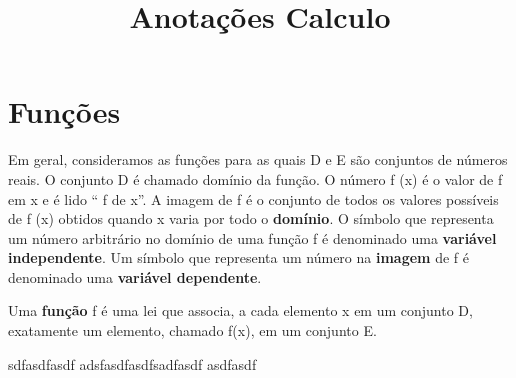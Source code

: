 \documentclass[10pt,a4paper]{article}
\title{Anotações Calculo}
\begin{document}
\maketitle
\tableofcontents
\newpage


\section{Funções}
Em geral, consideramos as funções para as quais D e E são conjuntos de números reais. O conjunto D é chamado domínio da função. O número f (x) é o valor de f em x e é lido “ f de x”. A imagem de f é o conjunto de todos os valores possíveis de f (x) obtidos quando x varia por todo o \textbf{domínio}. O símbolo que representa um número arbitrário no domínio de uma função f é denominado uma \textbf{variável independente}. Um símbolo que representa um número na \textbf{imagem} de f é denominado uma \textbf{variável dependente}.
\begin{df}
	Uma \textbf{função} f é uma lei que associa, a cada elemento x em um conjunto D, exatamente um elemento, chamado f(x), em um conjunto E.
\end{df}

\begin{obs}
	sdfasdfasdf adsfasdfasdfsadfasdf  asdfasdf
\end{obs}
\end{document}
